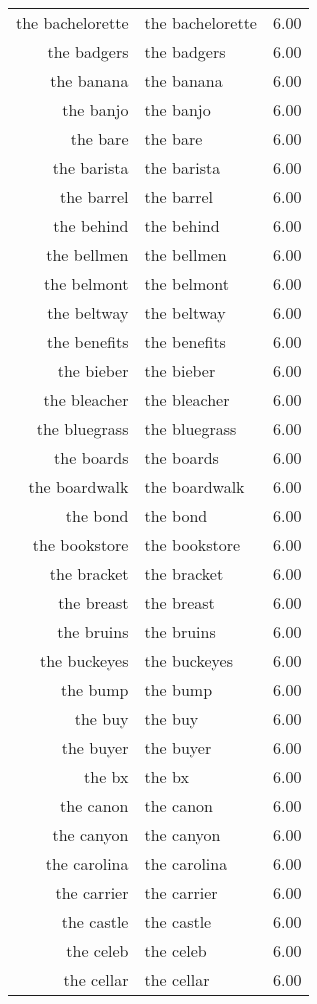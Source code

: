 \begin{table}[ht]
\begin{tabular}{rlr}
  the bachelorette & the bachelorette & 6.00 \\ 
  the badgers & the badgers & 6.00 \\ 
  the banana & the banana & 6.00 \\ 
  the banjo & the banjo & 6.00 \\ 
  the bare & the bare & 6.00 \\ 
  the barista & the barista & 6.00 \\ 
  the barrel & the barrel & 6.00 \\ 
  the behind & the behind & 6.00 \\ 
  the bellmen & the bellmen & 6.00 \\ 
  the belmont & the belmont & 6.00 \\ 
  the beltway & the beltway & 6.00 \\ 
  the benefits & the benefits & 6.00 \\ 
  the bieber & the bieber & 6.00 \\ 
  the bleacher & the bleacher & 6.00 \\ 
  the bluegrass & the bluegrass & 6.00 \\ 
  the boards & the boards & 6.00 \\ 
  the boardwalk & the boardwalk & 6.00 \\ 
  the bond & the bond & 6.00 \\ 
  the bookstore & the bookstore & 6.00 \\ 
  the bracket & the bracket & 6.00 \\ 
  the breast & the breast & 6.00 \\ 
  the bruins & the bruins & 6.00 \\ 
  the buckeyes & the buckeyes & 6.00 \\ 
  the bump & the bump & 6.00 \\ 
  the buy & the buy & 6.00 \\ 
  the buyer & the buyer & 6.00 \\ 
  the bx & the bx & 6.00 \\ 
  the canon & the canon & 6.00 \\ 
  the canyon & the canyon & 6.00 \\ 
  the carolina & the carolina & 6.00 \\ 
  the carrier & the carrier & 6.00 \\ 
  the castle & the castle & 6.00 \\ 
  the celeb & the celeb & 6.00 \\ 
  the cellar & the cellar & 6.00 \\ 

\end{tabular}
\end{table}
